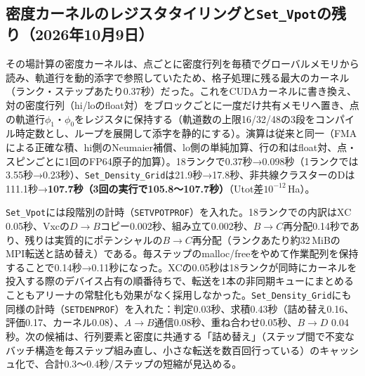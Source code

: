 \documentclass[a4paper,11pt]{ltjsarticle}
\newcommand{\code}[1]{\texttt{#1}}
\begin{document}
\subsection{密度カーネルのレジスタタイリングと\code{Set\_Vpot}の残り（2026年10月9日）}
その場計算の密度カーネルは、点ごとに密度行列を毎積でグローバルメモリから読み、軌道行を動的添字で参照していたため、格子処理に残る最大のカーネル（ランク・ステップあたり0.37秒）だった。これをCUDAカーネルに書き換え、対の密度行列（hi/loのfloat対）をブロックごとに一度だけ共有メモリへ置き、点の軌道行$\phi_1$・$\phi_0$をレジスタに保持する（軌道数の上限16/32/48の3段をコンパイル時定数とし、ループを展開して添字を静的にする）。演算は従来と同一（FMAによる正確な積、hi側のNeumaier補償、lo側の単純加算、行の和はfloat対、点・スピンごとに1回のFP64原子的加算）。18ランクで0.37秒→0.098秒（1ランクでは3.55秒→0.23秒）、\code{Set\_Density\_Grid}は21.9秒→17.8秒、非共線クラスターのDは111.1秒→\textbf{107.7秒（3回の実行で105.8〜107.7秒）}（Utot差$10^{-12}$\,Ha）。

\code{Set\_Vpot}には段階別の計時（\code{SETVPOTPROF}）を入れた。18ランクでの内訳はXC 0.05秒、Vxcの$D\to B$コピー0.002秒、組み立て0.002秒、$B\to C$再分配0.14秒であり、残りは実質的にポテンシャルの$B\to C$再分配（ランクあたり約32\,MiBのMPI転送と詰め替え）である。毎ステップのmalloc/freeをやめて作業配列を保持することで0.14秒→0.11秒になった。XCの0.05秒は18ランクが同時にカーネルを投入する際のデバイス占有の順番待ちで、転送を1本の非同期キューにまとめることもアリーナの常駐化も効果がなく採用しなかった。\code{Set\_Density\_Grid}にも同様の計時（\code{SETDENPROF}）を入れた：判定0.03秒、求積0.43秒（詰め替え0.16、評価0.17、カーネル0.08）、$A\to B$通信0.08秒、重ね合わせ0.05秒、$B\to D$ 0.04秒。次の候補は、行列要素と密度に共通する「詰め替え」（ステップ間で不変なバッチ構造を毎ステップ組み直し、小さな転送を数百回行っている）のキャッシュ化で、合計0.3〜0.4秒/ステップの短縮が見込める。
\end{document}
